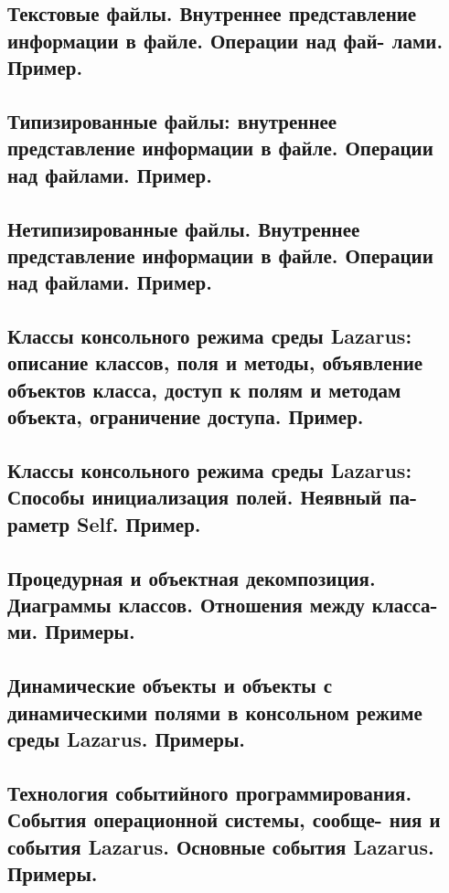 \documentclass[a4paper, 10pt]{article}
\begin{document}
\subsection{Текстовые  файлы.  Внутреннее  представление  информации  в  файле.  Операции  над  фай-
лами. Пример. }



\subsection{Типизированные  файлы:  внутреннее  представление  информации  в  файле.  Операции  над 
файлами. Пример. }



\subsection{Нетипизированные  файлы.  Внутреннее  представление  информации  в  файле.  Операции 
над файлами. Пример. }



\subsection{Классы консольного режима среды Lazarus: описание классов, поля и методы, объявление 
объектов класса, доступ к полям и методам объекта, ограничение доступа. Пример. }



\subsection{Классы консольного режима  среды  Lazarus: Способы инициализация полей. Неявный па-
раметр Self. Пример. }



\subsection{Процедурная и объектная декомпозиция. Диаграммы классов. Отношения между класса-
ми. Примеры. }



\subsection{Динамические объекты и объекты с динамическими полями в консольном режиме среды 
Lazarus. Примеры. }



\subsection{Технология  событийного  программирования.  События  операционной  системы,  сообще-
ния и события Lazarus. Основные события Lazarus. Примеры.}
\end{document}
